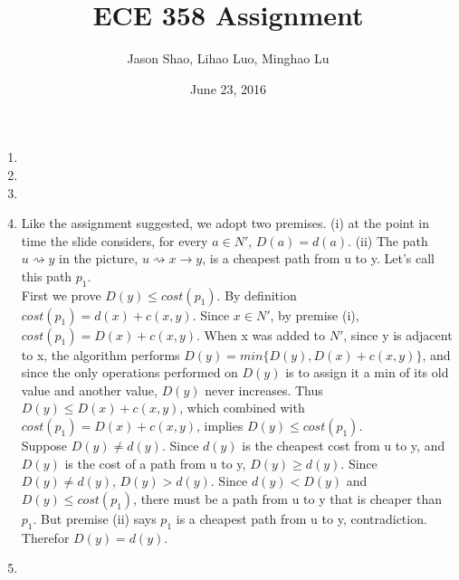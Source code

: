 \documentclass[12pt]{article}
\title{ECE 358 Assignment }
\author{Jason Shao, Lihao Luo, Minghao Lu}
\date{June 23, 2016}
\begin{document}
\maketitle
\renewcommand{\thesubsection}{Problem \arabic{subsection}}


\def\question#1{\item[\bf #1.]}
\def\part#1{\item[\bf #1)]}
\newcommand{\pc}[1]{\mbox{\textbf{#1}}} %

\begin{enumerate}
	\item %
	\item %
	\item %
	\item %
        Like the assignment suggested, we adopt two premises. 
        (i) at the point in time the slide considers, for every $a \in N'$, $D(a) = d(a)$. 
        (ii) The path $u \rightsquigarrow y$ in the picture, $u \rightsquigarrow x \rightarrow y$,
        is a cheapest path from u to y. Let's call this path $p_1$.\\


        First we prove $D(y) \leq cost(p_1)$. By definition $cost(p_1) = d(x) + c(x,y)$. Since $x \in N'$, 
        by premise (i), $cost(p_1) = D(x) + c(x,y)$. When x was added to $N'$, since y is adjacent to x,
        the algorithm performs $D(y) = min\{D(y), D(x)+c(x,y)\}$, and since the only operations performed on $D(y)$ is to assign
        it a min of its old value and another value, $D(y)$ never increases. Thus $D(y) \leq D(x) + c(x,y)$,
        which combined with $cost(p_1) = D(x) + c(x,y)$, implies $D(y) \leq cost(p_1)$. \\

        Suppose $D(y) \neq d(y)$. Since $d(y)$ is the cheapest cost from u to y, and $D(y)$ is the 
        cost of a path from u to y, $D(y) \geq d(y)$. Since $D(y) \neq d(y)$, $D(y) > d(y)$. 
        Since $d(y) < D(y)$ and $D(y) \leq cost(p_1)$, there must be a path from u to y that is cheaper 
        than $p_1$. But premise (ii) says $p_1$ is a cheapest path from u to y, contradiction. Therefor $D(y) = d(y)$.
        

	\item %
        

\end{enumerate}
\end{document}
